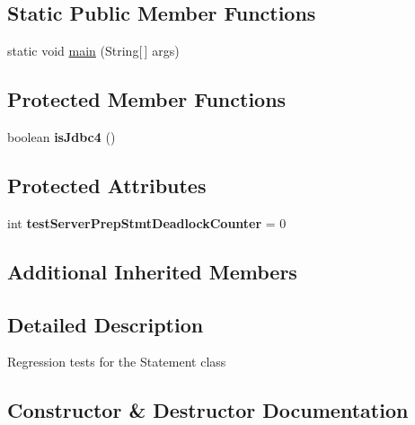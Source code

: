 \subsection*{Static Public Member Functions}
\begin{DoxyCompactItemize}
\item 
static void \mbox{\hyperlink{classtestsuite_1_1regression_1_1_statement_regression_test_a47cd85214f68ea331f0b16fcc90771a9}{main}} (String\mbox{[}$\,$\mbox{]} args)
\end{DoxyCompactItemize}
\subsection*{Protected Member Functions}
\begin{DoxyCompactItemize}
\item 
\mbox{\label{classtestsuite_1_1regression_1_1_statement_regression_test_a6b7552e96d31a8e98e72a372244188bc}} 
boolean {\bfseries is\+Jdbc4} ()
\end{DoxyCompactItemize}
\subsection*{Protected Attributes}
\begin{DoxyCompactItemize}
\item 
\mbox{\label{classtestsuite_1_1regression_1_1_statement_regression_test_abc0a2681fb2194305be7870e5e1dc1eb}} 
int {\bfseries test\+Server\+Prep\+Stmt\+Deadlock\+Counter} = 0
\end{DoxyCompactItemize}
\subsection*{Additional Inherited Members}


\subsection{Detailed Description}
Regression tests for the Statement class 

\subsection{Constructor \& Destructor Documentation}
\mbox{\label{classtestsuite_1_1regression_1_1_statement_regression_test_a8e0f198acfbe47561686edd750a55349}} 
